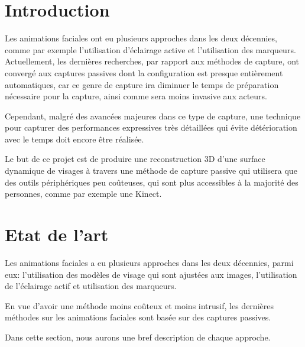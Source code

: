 \documentclass[a4paper,12pt]{article}
\begin{document}
\newpage
\thispagestyle{empty}
\tableofcontents
\newpage
\setcounter{page}{1}

\section{Introduction}

Les animations faciales ont eu plusieurs approches dans les deux
décennies, comme par exemple l'utilisation d'éclairage active et
l'utilisation des marqueurs. Actuellement, les dernières recherches,
par rapport aux méthodes de capture, ont convergé aux captures passives dont la
configuration est presque entièrement automatiques, car ce genre de
capture ira diminuer le temps de préparation nécessaire pour la
capture, ainsi comme sera moins invasive aux acteurs.

Cependant, malgré des avancées majeures dans ce type de capture, une
technique pour capturer des performances expressives très détaillées
qui évite détérioration avec le temps doit encore être réalisée.

Le but de ce projet est de produire une reconstruction 3D d'une
surface dynamique de visages à travers une méthode de capture passive
qui utilisera que des outils périphériques peu coûteuses, qui sont
plus accessibles à la majorité des personnes, comme par exemple une Kinect.



\section{Etat de l'art}

Les animations faciales a eu plusieurs approches dans les deux décennies, 
parmi eux: l'utilisation des modèles de visage qui sont ajustées aux images, 
l'utilisation de l'éclairage actif et utilisation des marqueurs.

En vue d'avoir une méthode moins coûteux et moins intrusif, les dernières
méthodes sur les animations faciales sont basée sur des captures passives.


Dans cette section, nous aurons une bref description de chaque
approche.
\end{document}
